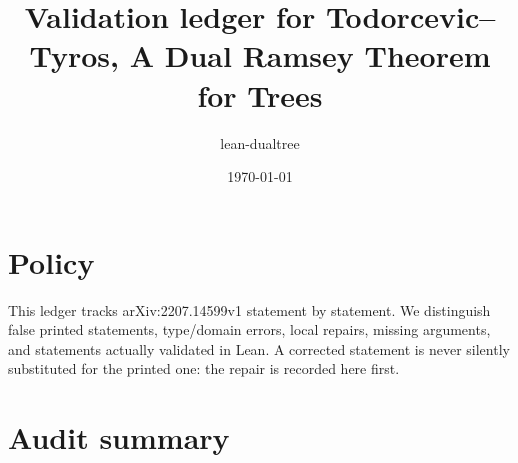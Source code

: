 \documentclass[11pt]{article}
\title{Validation ledger for Todorcevic--Tyros, A Dual Ramsey Theorem for Trees}
\author{lean-dualtree}
\date{\today}
\begin{document}
\maketitle

\section{Policy}
This ledger tracks arXiv:2207.14599v1 statement by statement.  We distinguish
false printed statements, type/domain errors, local repairs, missing arguments,
and statements actually validated in Lean.  A corrected statement is never
silently substituted for the printed one: the repair is recorded here first.

\section{Audit summary}
\end{document}

